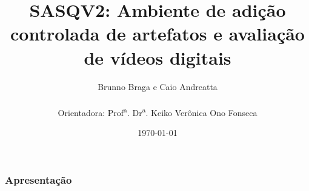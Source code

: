 \documentclass{beamer}
\title[First!]{SASQV2: Ambiente de adição controlada de artefatos e avaliação de vídeos digitais}
\author{Brunno Braga e Caio Andreatta \\ ~ \\ Orientadora: Prof\textsuperscript{a}. Dr\textsuperscript{a}. Keiko Verônica Ono Fonseca}
\institute{Universidade Tecnológica Federal do Paraná}
\date{\today}
\begin{document}
\frame{\titlepage}

\frame
{
    \frametitle{Apresentação}
    \setcounter{tocdepth}{1}
    \tableofcontents
}










\end{document}
